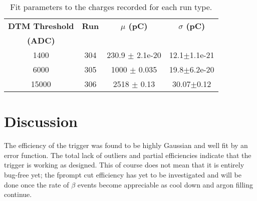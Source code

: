 \begin{table}[h]
\centering
\caption{Fit parameters to the charges recorded for each run type.}
\vspace{0.2cm}
\begin{tabular}{c	c	c	c}
\hline
\hline
\textbf{DTM Threshold}&		\textbf{Run}&		\textbf{$\mu$ (pC)}&		\textbf{$\sigma$ (pC)}\\
\textbf{(ADC)}&		&		&		\\

\hline
1400&	304&	230.9 $\pm$ 2.1e-20& 	12.1$\pm$1.1e-21\\		
6000&	305&	1000 $\pm$ 0.035& 	19.8$\pm$6.2e-20\\
15000&	306&	2518 $\pm$ 0.13& 	30.07$\pm$0.12\\
\hline
\hline
\end{tabular}
\label{Table:erfFitVals}
\end{table}
%
%

\section{Discussion}
The efficiency of the trigger was found to be highly Gaussian and well fit by an error function. The total lack of outliers and partial efficiencies indicate that the trigger is working as designed. This of course does not mean that it is entirely bug-free yet; the \gls{fprompt} cut efficiency has yet to be investigated and will be done once the rate of $\beta$ events become appreciable as cool down and argon filling continue. 

